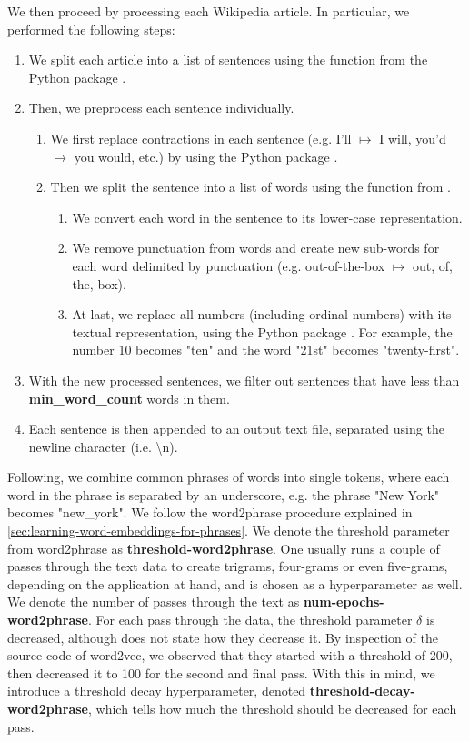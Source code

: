 We then proceed by processing each Wikipedia article. In particular, we performed the following steps:
\begin{enumerate}
    \item We split each article into a list of sentences using the  function from the  Python package \cite{bird2009natural}.
    \item Then, we preprocess each sentence individually.
    \begin{enumerate}
        \item We first replace contractions in each sentence (e.g. I'll $\mapsto$ I will, you'd $\mapsto$ you would, etc.) by using the  Python package \cite{contractions-2016}.
        \item Then we split the sentence into a list of words using the  function from .
        \begin{enumerate}
            \item We convert each word in the sentence to its lower-case representation.
            \item We remove punctuation from words and create new sub-words for each word delimited by punctuation (e.g. out-of-the-box $\mapsto$ out, of, the, box).
            \item At last, we replace all numbers (including ordinal numbers) with its textual representation, using the  Python package \cite{num2words2014}. For example, the number 10 becomes "ten" and the word "21st" becomes "twenty-first".
        \end{enumerate}
    \end{enumerate}
    \item With the new processed sentences, we filter out sentences that have less than \textbf{min\_word\_count} words in them.
    \item Each sentence is then appended to an output text file, separated using the newline character (i.e. \textbackslash n).
\end{enumerate}

Following, we combine common phrases of words into single tokens, where each word in the phrase is separated by an underscore, e.g. the phrase "New York" becomes "new\_york". We follow the word2phrase procedure explained in \cref{sec:learning-word-embeddings-for-phrases}. We denote the threshold parameter from word2phrase as \textbf{threshold-word2phrase}. One usually runs a couple of passes through the text data to create trigrams, four-grams or even five-grams, depending on the application at hand, and is chosen as a hyperparameter as well. We denote the number of passes through the text as \textbf{num-epochs-word2phrase}. For each pass through the data, the threshold parameter $\delta$ is decreased, although \cite{mikolov2013b} does not state how they decrease it. By inspection of the source code of word2vec, we observed that they started with a threshold of 200, then decreased it to 100 for the second and final pass. With this in mind, we introduce a threshold decay hyperparameter, denoted \textbf{threshold-decay-word2phrase}, which tells how much the threshold should be decreased for each pass.


